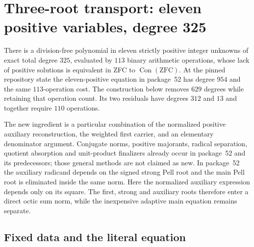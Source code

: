\section{Three-root transport: eleven positive variables, degree 325}
\label{rt11:section}

There is a division-free polynomial in eleven strictly positive integer
unknowns of exact total degree $325$, evaluated by $113$ binary arithmetic
operations, whose lack of positive solutions is equivalent in ZFC to
$\operatorname{Con}(\mathrm{ZFC})$. At the pinned repository state the
eleven-positive equation in package~52 has degree $954$ and the same
$113$-operation cost. The construction below removes $629$ degrees while
retaining that operation count. Its two residuals have degrees $312$ and
$13$ and together require $110$ operations.

The new ingredient is a particular combination of the normalized positive
auxiliary reconstruction, the weighted first carrier, and an elementary
denominator argument. Conjugate norms, positive majorants, radical
separation, quotient absorption and unit-product finalizers already occur
in package~52 and its predecessors; those general methods are not claimed
as new. In package~52 the auxiliary radicand depends on the signed strong
Pell root and the main Pell root is eliminated inside the same norm.
Here the normalized auxiliary expression depends only on its square.
The first, strong and auxiliary roots therefore enter a direct octic
sum norm, while the inexpensive adaptive main equation remains separate.

\subsection{Fixed data and the literal equation}

